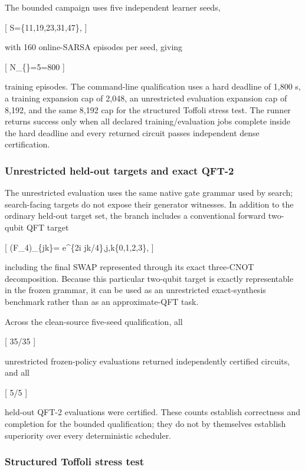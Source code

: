 \documentclass[
]{article}
\begin{document}
The bounded campaign uses five independent learner seeds,

{[} \mathcal S=\{11,19,23,31,47\},  {]}

with 160 online-SARSA episodes per seed, giving

{[} N\_\{\}=5=800  {]}

training episodes. The command-line qualification uses a hard deadline
of 1,800 s, a training expansion cap of 2,048, an unrestricted
evaluation expansion cap of 8,192, and the same 8,192 cap for the
structured Toffoli stress test. The runner returns success only when all
declared training/evaluation jobs complete inside the hard deadline and
every returned circuit passes independent dense certification.

\hypertarget{unrestricted-held-out-targets-and-exact-qft-2}{%
\subsubsection{Unrestricted held-out targets and exact
QFT-2}\label{unrestricted-held-out-targets-and-exact-qft-2}}

The unrestricted evaluation uses the same native gate grammar used by
search; search-facing targets do not expose their generator witnesses.
In addition to the ordinary held-out target set, the branch includes a
conventional forward two-qubit QFT target

{[} (F\_4)\_\{jk\}= e\^{}\{2\pi i
jk/4\},\qquad j,k\in\{0,1,2,3\},  {]}

including the final SWAP represented through its exact three-CNOT
decomposition. Because this particular two-qubit target is exactly
representable in the frozen grammar, it can be used as an unrestricted
exact-synthesis benchmark rather than as an approximate-QFT task.

Across the clean-source five-seed qualification, all

{[} 35/35  {]}

unrestricted frozen-policy evaluations returned independently certified
circuits, and all

{[} 5/5  {]}

held-out QFT-2 evaluations were certified. These counts establish
correctness and completion for the bounded qualification; they do not by
themselves establish superiority over every deterministic scheduler.

\hypertarget{structured-toffoli-stress-test}{%
\subsubsection{Structured Toffoli stress
test}\label{structured-toffoli-stress-test}}
\end{document}
